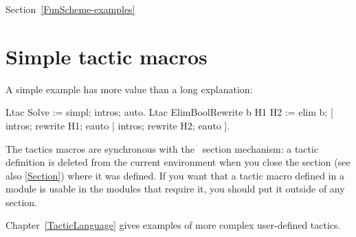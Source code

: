 \SeeAlso Section~\ref{FunScheme-examples}


\section{Simple tactic macros
\label{TacticDefinition}}

A simple example has more value than a long explanation: 

\begin{coq_example}
Ltac Solve := simpl; intros; auto.
Ltac ElimBoolRewrite b H1 H2 :=
  elim b; [ intros; rewrite H1; eauto | intros; rewrite H2; eauto ].
\end{coq_example}

The tactics macros are synchronous with the \Coq\ section mechanism:
a tactic definition is deleted from the current environment
when you close the section (see also \ref{Section}) 
where it was defined. If you want that a
tactic macro defined in a module is usable in the modules that
require it, you should put it outside of any section.

Chapter~\ref{TacticLanguage} gives examples of more complex
user-defined tactics.




